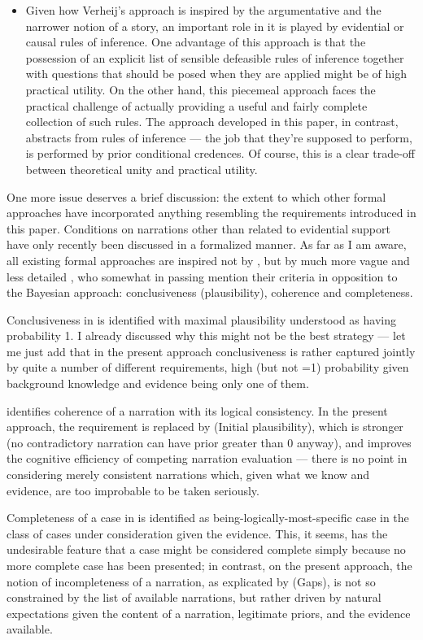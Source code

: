 \documentclass[10pt,leqno]{article}
\begin{document}
\begin{itemize}
\item Given how Verheij's approach is inspired by the argumentative and the narrower notion of a story, an important role in it is played by evidential or causal rules of inference. One advantage of this approach is that the possession of an explicit list of sensible defeasible rules of inference together with questions that should be posed when they are applied might be of high practical utility. On the other hand, this piecemeal approach faces the practical challenge of actually providing a useful and fairly complete collection of such rules. The approach developed in this paper, in contrast, abstracts from rules of inference --- the job that they're supposed to perform, is performed by prior conditional credences. Of course, this is a clear trade-off between theoretical unity and practical utility. 
\end{itemize}


One more issue deserves a brief discussion: the extent to which other formal approaches have incorporated anything resembling the requirements introduced in this paper. Conditions on narrations other than related to evidential support have only recently been discussed in a formalized manner. As far as I am aware, all existing formal approaches are inspired not by \citep{di2013statistics}, but by much more vague and less detailed \citep{pennington1991cognitive,pennington1993story}, who somewhat in passing mention their criteria in opposition to the Bayesian approach: conclusiveness (plausibility), coherence and completeness.

Conclusiveness in \citep{verheijproof2017} is identified with maximal plausibility understood as having probability 1. I already discussed why this might not be the best strategy --- let me just add that in the present approach conclusiveness is   rather captured jointly by quite a number of different requirements, high (but not =1) probability given background knowledge and evidence being only one of them.

 \citet{verheijproof2017} identifies coherence of a narration with its logical consistency. In the present approach, the requirement is replaced by (Initial plausibility), which is stronger (no contradictory narration can have prior greater than 0 anyway), and improves the cognitive efficiency of competing narration evaluation --- there is no point in considering merely consistent narrations which, given what we know and evidence, are too improbable to be taken seriously. 

 Completeness of a case in \citep{verheijproof2017}  is identified as being-logically-most-specific case in the class of cases under consideration given the evidence. This, it seems, has the undesirable feature that a case might be considered complete simply because no more complete case has been presented; in contrast, on the present approach, the notion of incompleteness of a narration, as explicated by (Gaps), is not so constrained by the list of available narrations, but rather driven by natural expectations given the content of a narration, legitimate priors, and the evidence available. 
\end{document}
